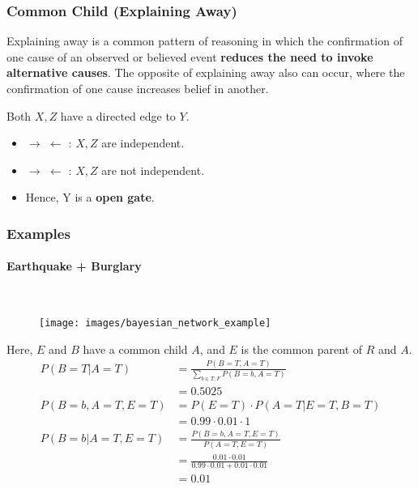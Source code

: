 \documentclass[a4paper]{article}
\newcommand*{\img}[1]{%
	\raisebox{-.3\baselineskip}{%
		\texttt{[image: \#1]}%
	}%
}
\begin{document}
\subsubsection{Common Child (Explaining Away)}
\begin{framed}
	\begin{displayquote}
		Explaining away is a common pattern of reasoning in which the confirmation of one cause of an observed or believed event \textbf{reduces the need to invoke alternative causes}. The opposite of explaining away also can occur, where the confirmation of one cause increases belief in another.
	\end{displayquote}
\end{framed}
Both $X,Z$ have a directed edge to $Y$.
\begin{itemize}
	\item \img{images/26AA}$\rightarrow$\img{images/26AB}$\leftarrow$\img{images/26AA}: $X,Z$ are independent.
	\item \img{images/26AA}$\rightarrow$\img{images/26AA}$\leftarrow$\img{images/26AA}: $X,Z$ are not independent.
	\item Hence, Y is a \textbf{open gate}.
\end{itemize}
\newpage
\subsubsection{Examples}
\paragraph{Earthquake + Burglary}\mbox{}\\
\begin{figure}[H]
	\centering
	\texttt{[image: images/bayesian\_network\_example]}
	\label{fig:bay_network}
\end{figure}
\noindent Here, $E$ and $B$ have a common child $A$, and $E$ is the common parent of $R$ and $A$.
\begin{align*}
	P(B=T|A=T) &= \frac{P(B=T,A=T)}{\sum_{b\in{T,F}}P(B=b,A=T)}\\
	&= 0.5025\\
	P(B=b, A=T, E=T) &= P(E=T) \cdot P(A=T | E=T, B=T)\\
	&= 0.99 \cdot 0.01 \cdot 1\\
	P(B=b |A=T, E=T) &= \frac{P(B=b, A=T,E=T)}{P(A=T,E=T)}\\
	&= \frac{0.01 \cdot 0.01}{0.99\cdot 0.01 + 0.01\cdot 0.01}\\
	&= 0.01
\end{align*}
\end{document}
